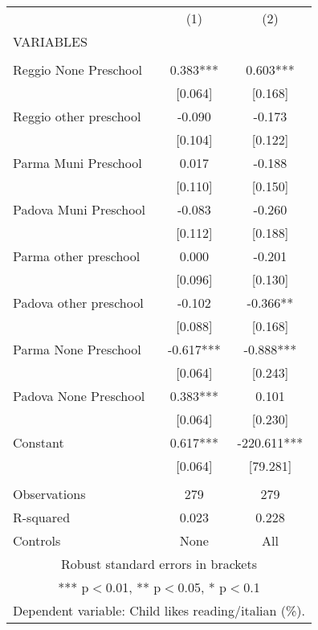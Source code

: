 \begin{tabular}{lcc} \hline
 & (1) & (2) \\
VARIABLES &  &  \\ \hline
 &  &  \\
Reggio None Preschool & 0.383*** & 0.603*** \\
 & [0.064] & [0.168] \\
Reggio other preschool & -0.090 & -0.173 \\
 & [0.104] & [0.122] \\
Parma Muni Preschool & 0.017 & -0.188 \\
 & [0.110] & [0.150] \\
Padova Muni Preschool & -0.083 & -0.260 \\
 & [0.112] & [0.188] \\
Parma other preschool & 0.000 & -0.201 \\
 & [0.096] & [0.130] \\
Padova other preschool & -0.102 & -0.366** \\
 & [0.088] & [0.168] \\
Parma None Preschool & -0.617*** & -0.888*** \\
 & [0.064] & [0.243] \\
Padova None Preschool & 0.383*** & 0.101 \\
 & [0.064] & [0.230] \\
Constant & 0.617*** & -220.611*** \\
 & [0.064] & [79.281] \\
 &  &  \\
Observations & 279 & 279 \\
R-squared & 0.023 & 0.228 \\
 Controls & None & All \\ \hline
\multicolumn{3}{c}{ Robust standard errors in brackets} \\
\multicolumn{3}{c}{ *** p$<$0.01, ** p$<$0.05, * p$<$0.1} \\
\multicolumn{3}{c}{ Dependent variable: Child likes reading/italian (\%).} \\
\end{tabular}
